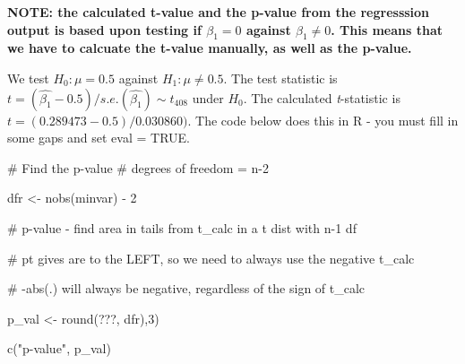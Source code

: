 \documentclass[
  a4paper,
  DIV=11,
  numbers=noendperiod]{scrartcl}
\newenvironment{Shaded}{\begin{snugshade}}{\end{snugshade}}
\newcommand{\CommentTok}[1]{\textcolor[rgb]{0.37,0.37,0.37}{#1}}
\newcommand{\DecValTok}[1]{\textcolor[rgb]{0.68,0.00,0.00}{#1}}
\newcommand{\ErrorTok}[1]{\textcolor[rgb]{0.68,0.00,0.00}{#1}}
\newcommand{\FunctionTok}[1]{\textcolor[rgb]{0.28,0.35,0.67}{#1}}
\newcommand{\NormalTok}[1]{\textcolor[rgb]{0.00,0.23,0.31}{#1}}
\newcommand{\OtherTok}[1]{\textcolor[rgb]{0.00,0.23,0.31}{#1}}
\newcommand{\SpecialCharTok}[1]{\textcolor[rgb]{0.37,0.37,0.37}{#1}}
\newcommand{\StringTok}[1]{\textcolor[rgb]{0.13,0.47,0.30}{#1}}
\begin{document}
\textcolor{awesome}{\textbf{NOTE: the calculated t-value and the p-value from the regresssion output is based upon testing if $\beta_1=0$ against $\beta_1\neq0$. This means that we have to calcuate the t-value manually, as well as the p-value.}}

\textcolor{awesome}{We test $H_0:\mu=0.5$ against $H_1:\mu\neq0.5$. The test statistic is $t=(\hat{\beta_1}-0.5)/s.e.(\hat{\beta_1})\sim t_{408}$ under $H_0$. The calculated \textit{t}-statistic is $t=(0.289473-0.5)/0.030860)$. The code below does this in R - you must fill in some gaps and set eval = TRUE.}

\begin{Shaded}
\end{Shaded}

\begin{Shaded}
\begin{Highlighting}[]
\CommentTok{\# Find the p{-}value}
\CommentTok{\# degrees of freedom = n{-}2}

\NormalTok{dfr }\OtherTok{\textless{}{-}} \FunctionTok{nobs}\NormalTok{(minvar) }\SpecialCharTok{{-}} \DecValTok{2}

\CommentTok{\# p{-}value {-} find area in tails from t\_calc in a t dist with n{-}1 df }

\CommentTok{\# pt gives are to the LEFT, so we need to always use the negative t\_calc}

\CommentTok{\# {-}abs(.) will always be negative, regardless of the sign of t\_calc}

\NormalTok{p\_val  }\OtherTok{\textless{}{-}} \FunctionTok{round}\NormalTok{(???, dfr),}\DecValTok{3}\ErrorTok{)} 

\FunctionTok{c}\NormalTok{(}\StringTok{"p{-}value"}\NormalTok{, p\_val)}
\end{Highlighting}
\end{Shaded}
\end{document}
